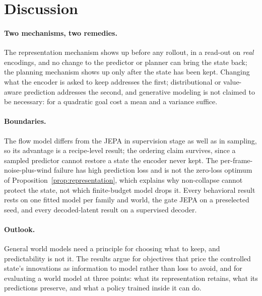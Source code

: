 \section{Discussion}
\label{sec:discussion}

\paragraph{Two mechanisms, two remedies.}
The representation mechanism shows up before any rollout, in a read-out on \emph{real} encodings,
and no change to the predictor or planner can bring the state back; the planning mechanism shows up
only after the state has been kept. Changing what the encoder is asked to keep addresses the first;
distributional or value-aware prediction addresses the second, and generative modeling is not
claimed to be necessary: for a quadratic goal cost a mean and a variance suffice.

\paragraph{Boundaries.}
The flow model differs from the JEPA in supervision stage as well as in sampling, so its advantage
is a recipe-level result; the ordering claim survives, since a sampled predictor cannot restore a
state the encoder never kept. The per-frame-noise-plus-wind failure has high prediction loss and is
not the zero-loss optimum of Proposition~\ref{prop:representation}, which explains why non-collapse
cannot protect the state, not which finite-budget model drops it. Every behavioral result rests on
one fitted model per family and world, the gate JEPA on a preselected seed, and every decoded-latent
result on a supervised decoder.

\paragraph{Outlook.}
General world models need a principle for choosing what to keep, and predictability is not it.
The results argue for objectives that price the controlled state's innovations as information to
model rather than loss to avoid, and for evaluating a world model at three points: what its
representation retains, what its predictions preserve, and what a policy trained inside it can do.

